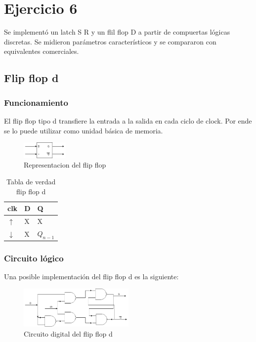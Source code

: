 \documentclass[../../e3_tp2_main.tex]{subfiles}
\begin{document}
\chapter{Ejercicio 6}
Se implementó un latch S R y un flil flop D a partir de compuertas lógicas discretas. Se midieron parámetros característicos y se compararon con equivalentes comerciales.
\section{Flip flop d}
\subsection{Funcionamiento}
El flip flop tipo d transfiere la entrada a la salida en cada ciclo de clock. Por ende se lo puede utilizar como unidad básica de memoria.
\begin{figure}[H]	
	\centering
	\includegraphics[width=0.2\textwidth]{imagenes/ffd_b.png}
	\caption{Representacion del flip flop}
\end{figure}

\begin{table}[h]
\begin{center}
\begin{tabular}{|l|l|l|}
\hline
clk& D & Q\\
\hline \hline
$\uparrow$ & X & X \\ \hline
$\downarrow$ &X  &$Q_{n-1}$ \\ \hline
\end{tabular}
\caption{Tabla de verdad flip flop d} 
\end{center}
\end{table}

\subsection{Circuito lógico}
Una posible implementación del flip flop d es la siguiente:
\begin{figure}[H]	
	\centering
	\includegraphics[width=0.5\textwidth]{imagenes/ffd_cd.png}
	\caption{Circuito digital del flip flop d}
\end{figure}
\end{document}
